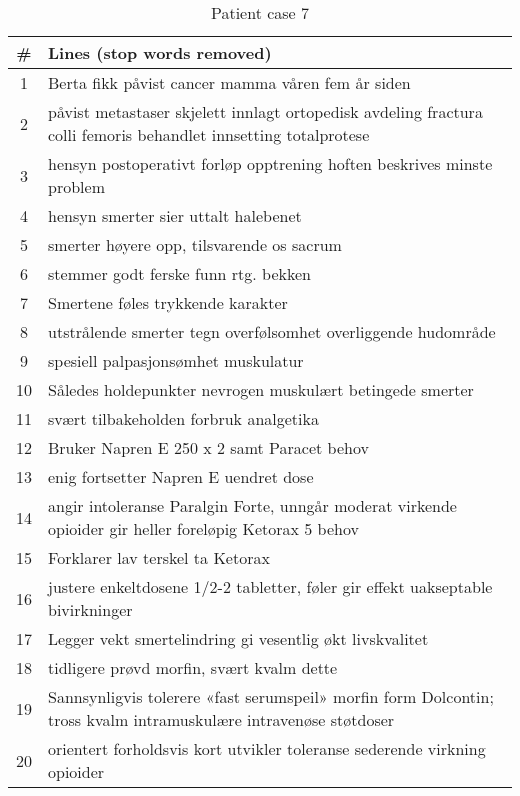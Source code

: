 \begin{table}[htbp] \footnotesize \center
\caption{Patient case 7\label{tab:pcase7}}
\begin{tabularx}{\textwidth}{c X}
    \toprule
    \# & Lines (stop words removed) \\
    \midrule
	1 & Berta fikk påvist cancer mamma våren fem år siden \\
	2 & påvist metastaser skjelett innlagt ortopedisk avdeling fractura colli femoris behandlet innsetting totalprotese \\
	3 & hensyn postoperativt forløp opptrening hoften beskrives minste problem \\
	4 & hensyn smerter sier uttalt halebenet \\
	5 & smerter høyere opp, tilsvarende os sacrum \\
	6 & stemmer godt ferske funn rtg. bekken \\
	7 & Smertene føles trykkende karakter \\
	8 & utstrålende smerter tegn overfølsomhet overliggende hudområde \\
	9 & spesiell palpasjonsømhet muskulatur \\
	10 & Således holdepunkter nevrogen muskulært betingede smerter \\
	11 & svært tilbakeholden forbruk analgetika \\
	12 & Bruker Napren E 250 x 2 samt Paracet behov \\
	13 & enig fortsetter Napren E uendret dose \\
	14 & angir intoleranse Paralgin Forte, unngår moderat virkende opioider gir heller foreløpig Ketorax 5 behov \\
	15 & Forklarer lav terskel ta Ketorax \\
	16 & justere enkeltdosene 1/2-2 tabletter, føler gir effekt uakseptable bivirkninger \\
	17 & Legger vekt smertelindring gi vesentlig økt livskvalitet \\
	18 & tidligere prøvd morfin, svært kvalm dette \\
	19 & Sannsynligvis tolerere «fast serumspeil» morfin form Dolcontin; tross kvalm intramuskulære intravenøse støtdoser \\
	20 & orientert forholdsvis kort utvikler toleranse sederende virkning opioider \\
	\bottomrule
\end{tabularx}
\end{table}


